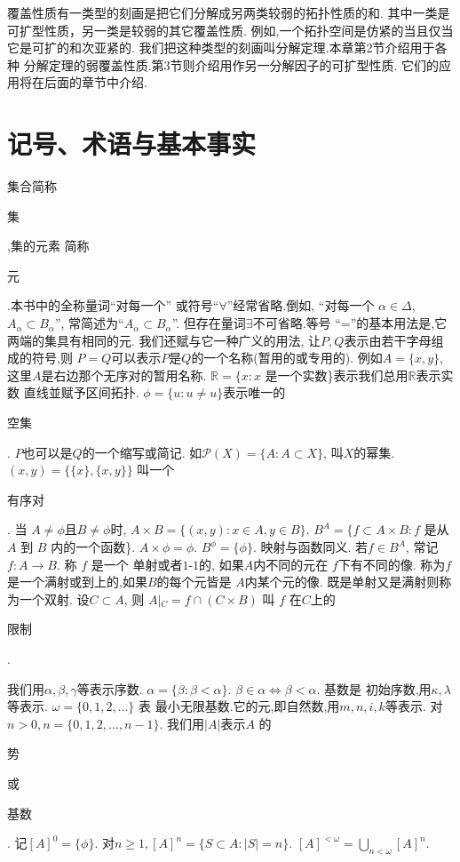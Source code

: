 \documentclass[main.tex]{subfiles}
\begin{document}
	
覆盖性质有一类型的刻画是把它们分解成另两类较弱的拓扑性质的和.
其中一类是可扩型性质，另一类是较弱的其它覆盖性质.
例如,一个拓扑空间是仿紧的当且仅当它是可扩的和次亚紧的.
我们把这种类型的刻画叫分解定理.本章第2节介绍用于各种
分解定理的弱覆盖性质.第3节则介绍用作另一分解因子的可扩型性质.
它们的应用将在后面的章节中介绍.
	
\section{记号、术语与基本事实}\label{ch1.1}
集合简称\begin{kaishu}集\end{kaishu},集的元素
简称\begin{kaishu}元\end{kaishu}.本书中的全称量词“对每一个”
或符号“$\forall$”经常省略.倒如, “对每一个
$\alpha\in\Delta$, $A_\alpha \subset B_\alpha$”,
常简述为“$A_\alpha \subset B_\alpha$”.
但存在量词$\exists$不可省略.等号
“=”的基本用法是,它两端的集具有相同的元.
我们还赋与它一种广义的用法, 让$P, Q$表示由若干字母组成的符号,则
$P=Q$可以表示$P$是$Q$的一个名称(暂用的或专用的).
例如$A=\{x,y\}$,这里$A$是右边那个无序对的暂用名称.
$\mathbb{R} = \{x: x$ 是一个实数\}表示我们总用$\mathbb{R}$表示实数
直线並赋予区间拓扑.
$\phi=\{u: u\ne u\}$表示唯一的\begin{kaishu}空集\end{kaishu}.
$P$也可以是$Q$的一个缩写或简记. 如$\mathscr{P}(X)=\{A:A\subset X\}$, 叫$X$的幂集.
$(x, y) = \{ \{x\}, \{x, y\}\}$ 叫一个\begin{kaishu}有序对\end{kaishu}. 
当 $A\ne \phi$且$B\ne \phi$时, $A\times B = \{(x, y): x\in A, y\in B\}$.
$B^A = \{f\subset A\times B: f$ 是从 $A$ 到 $B$ 内的一个函数\}.
$A\times \phi = \phi$. $B^\phi = \{\phi\}$.
映射与函数同义.  若$f\in B^A$, 常记 $f: A\to B$. 称 $f$ 是一个
单射或者$1$-$1$的, 如果$A$内不同的元在  $f$下有不同的像.
称为$f$是一个满射或到上的,如果$B$的每个元皆是
$A$内某个元的像. 既是单射又是满射则称为一个双射.
设$C\subset A$, 则 $A\vert{}_C = f\cap (C\times B)$ 叫 $f$
在$C$上的\begin{kaishu}限制\end{kaishu}.

我们用$\alpha, \beta, \gamma$等表示序数. $\alpha = \{\beta: \beta < \alpha\}$. $\beta \in \alpha \Leftrightarrow\beta<\alpha$. 基数是
初始序数,用$\kappa,\lambda$ 等表示. $\omega = \{0, 1, 2, \dots\}$ 表
最小无限基数.它的元,即自然数,用$m, n, i , k$等表示.
对$n>0, n = \{0,1,2, \dots, n-1\}$. 我们用$|A|$表示$A$ 
的\begin{kaishu}势\end{kaishu}或\begin{kaishu}基数\end{kaishu}.
记$[A]^0=\{\phi\}$. 对$n\ge1, [A]^n = \{S\subset A: |S| = n\}$.
$[A]^{<\omega} = \bigcup_{n<\omega}[A]^n$.
\end{document}
